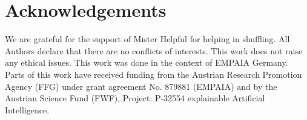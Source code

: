 \documentclass[a4paper,5p,review]{elsarticle}
\begin{document}
\section*{Acknowledgements}

We are grateful for the support of Mister Helpful for helping in shuffling. All Authors declare that there are no conflicts of interests. This work does not raise any ethical issues. This work was done in the context of EMPAIA Germany. Parts of this work have received funding from the Austrian Research Promotion Agency (FFG) under grant agreement No. 879881 (EMPAIA) and by the Austrian Science Fund (FWF), Project: P-32554 explainable Artificial Intelligence. 







\end{document}
